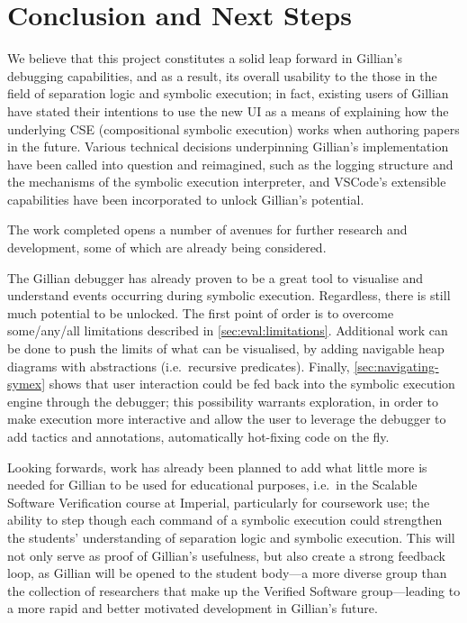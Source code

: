
\chapter{Conclusion and Next Steps}\label{sec:conclusion}

We believe that this project constitutes a solid leap forward in Gillian's
debugging capabilities, and as a result, its overall usability to the those in
the field of separation logic and symbolic execution; in fact, existing users of
Gillian have stated their intentions to use the new UI as a means of explaining
how the underlying CSE (compositional symbolic execution) works when authoring
papers in the future. Various technical decisions underpinning Gillian's
implementation have been called into question and reimagined, such as the
logging structure and the mechanisms of the symbolic execution interpreter, and
VSCode's extensible capabilities have been incorporated to unlock Gillian's
potential.

The work completed opens a number of avenues for further research and
development, some of which are already being considered.

The Gillian debugger has already proven to be a great tool to visualise and
understand events occurring during symbolic execution. Regardless, there is
still much potential to be unlocked.
The first point of order is to overcome some/any/all limitations described in
\autoref{sec:eval:limitations}. Additional work can be done to push the limits
of what can be visualised, by adding navigable heap diagrams with abstractions
(i.e.\ recursive predicates). Finally, \autoref{sec:navigating-symex} shows that
user interaction could be fed back into the symbolic execution engine through
the debugger; this possibility warrants exploration, in order to make execution
more interactive and allow the user to leverage the debugger to add tactics and
annotations, automatically hot-fixing code on the fly. 

Looking forwards, work has already been planned to add what little more is
needed for Gillian to be used for educational purposes, i.e.\ in the Scalable
Software Verification course at Imperial, particularly for coursework use; the
ability to step though each command of a symbolic execution could strengthen the
students' understanding of separation logic and symbolic execution. This will
not only serve as proof of Gillian's usefulness, but also create a strong
feedback loop, as Gillian will be opened to the student body---a more diverse
group than the collection of researchers that make up the Verified Software
group---leading to a more rapid and better motivated development in Gillian's
future.

